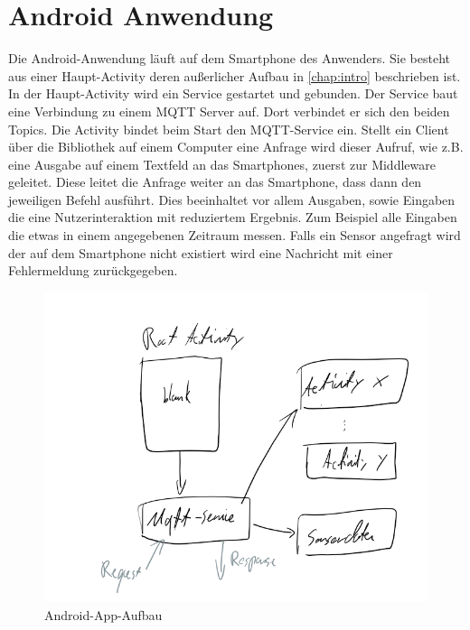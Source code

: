 \documentclass[11pt,a4paper]{report}
\begin{document}
\section*{Android Anwendung}
Die Android-Anwendung läuft auf dem Smartphone des Anwenders.
Sie besteht aus einer Haupt-Activity deren außerlicher Aufbau in \ref{chap:intro} beschrieben ist. 
\\
In der Haupt-Activity wird ein Service gestartet und gebunden.
Der Service baut eine Verbindung zu einem MQTT Server auf.
Dort verbindet er sich den beiden Topics. 
Die Activity bindet beim Start den MQTT-Service ein.
Stellt ein Client über die Bibliothek auf einem Computer eine Anfrage wird dieser Aufruf, wie z.B. eine Ausgabe auf einem Textfeld an das Smartphones,  zuerst zur Middleware geleitet.
Diese leitet die Anfrage weiter an das Smartphone, dass dann den jeweiligen Befehl ausführt.
Dies beeinhaltet vor allem Ausgaben, sowie Eingaben die eine Nutzerinteraktion mit reduziertem Ergebnis.
Zum Beispiel alle Eingaben die etwas in einem angegebenen Zeitraum messen.
Falls ein Sensor angefragt wird der auf dem Smartphone nicht existiert wird eine Nachricht mit einer Fehlermeldung zurückgegeben.
\begin{figure}[htbp]
  \centering
  \includegraphics[width=.9\textwidth]{images/android_app.png}
  \caption{Android-App-Aufbau}
  \label{fig:android_app}
\end{figure}
\end{document}
